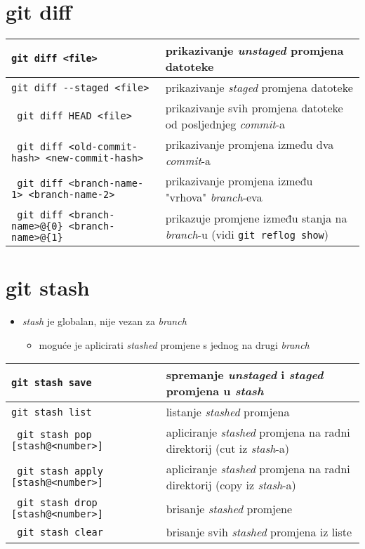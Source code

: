 \documentclass[10pt]{article}
\begin{document}
    \section*{git diff}
    \begin{tabular}{|>{\tt}p{9.00cm}|>{}p{15.50cm}|}
        \hline
        git diff <file>                                         & prikazivanje \textit{unstaged} promjena datoteke \\ \hline
        git diff -{}-staged <file>                              & prikazivanje \textit{staged} promjena datoteke \\ \hline
        git diff HEAD <file>                                    & prikazivanje svih promjena datoteke od posljednjeg \textit{commit}-a \\ \hline
        git diff <old-commit-hash> <new-commit-hash>            & prikazivanje promjena između dva \textit{commit}-a \\ \hline
        git diff <branch-name-1> <branch-name-2>                & prikazivanje promjena između "vrhova" \textit{branch}-eva \\ \hline
        git diff <branch-name>@\{0\} <branch-name>@\{1\}        & prikazuje promjene između stanja na \textit{branch}-u (vidi \texttt{git reflog show}) \\ \hline
    \end{tabular}

    \section*{git stash}
    \begin{itemize}
        \item \textit{stash} je globalan, nije vezan za \textit{branch}
        \begin{itemize}
            \item moguće je aplicirati \textit{stashed} promjene s jednog na drugi \textit{branch}
        \end{itemize}
    \end{itemize}
    \begin{tabular}{|>{\tt}p{9.00cm}|>{}p{15.50cm}|}
        \hline
        git stash save                                  & spremanje \textit{unstaged} i \textit{staged} promjena u \textit{stash} \\ \hline
        git stash list                                  & listanje \textit{stashed} promjena \\ \hline
        git stash pop [stash@{<number>}]                & apliciranje \textit{stashed} promjena na radni direktorij (cut iz \textit{stash}-a) \\ \hline
        git stash apply [stash@{<number>}]              & apliciranje \textit{stashed} promjena na radni direktorij (copy iz \textit{stash}-a) \\ \hline
        git stash drop [stash@{<number>}]               & brisanje \textit{stashed} promjene \\ \hline
        git stash clear                                 & brisanje svih \textit{stashed} promjena iz liste \\ \hline
    \end{tabular}
\end{document}
